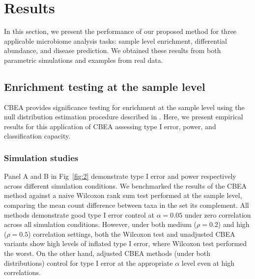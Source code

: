 \documentclass[10pt,letterpaper]{article}
\begin{document}
\section*{Results}
In this section, we present the performance of our proposed method for three applicable microbiome analysis tasks: sample level enrichment, differential abundance, and disease prediction. We obtained these results from both parametric simulations and examples from real data.  

\subsection*{Enrichment testing at the sample level}
CBEA provides significance testing for enrichment at the sample level using the null distribution estimation procedure described in . Here, we present empirical results for this application of CBEA assessing type I error, power, and classification capacity. 

\subsubsection*{Simulation studies}
Panel A and B in Fig~\ref{fig:2} demonstrate type I error and power respectively across different simulation conditions. We benchmarked the results of the CBEA method against a naive Wilcoxon rank sum test performed at the sample level, comparing the mean count difference between taxa in the set its complement. All methods demonstrate good type I error control at $\alpha = 0.05$ under zero correlation across all simulation conditions. However, under both medium ($\rho = 0.2$) and high ($\rho = 0.5$) correlation settings, both the Wilcoxon test and unadjusted CBEA variants show high levels of inflated type I error, where Wilcoxon test performed the worst. On the other hand, adjusted CBEA methods (under both distributions) control for type I error at the appropriate $\alpha$ level even at high correlations. 
\end{document}
